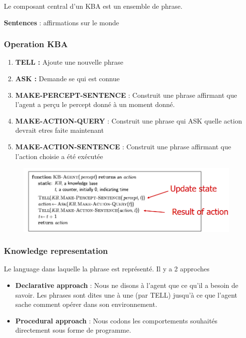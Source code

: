 \documentclass[12pt]{article}
\begin{document}
		
		Le composant central d'un KBA est un ensemble de phrase.
		
		\textbf{Sentences} : affirmations sur le monde
			
			
		\subsubsection{Operation KBA}
			\begin{enumerate}
				\item \textbf{TELL :} Ajoute une nouvelle phrase
				\item \textbf{ASK :} Demande se qui est connue
				\item \textbf{MAKE-PERCEPT-SENTENCE} : Construit une phrase affirmant que l'agent a perçu le percept donné à un moment donné.
				\item \textbf{MAKE-ACTION-QUERY} : Construit une phrase qui ASK quelle action devrait etres faite maintenant
				\item \textbf{MAKE-ACTION-SENTENCE} : Construit une phrase affirmant que l'action choisie a été exécutée
			\end{enumerate}
			
			\begin{figure}[htp]
				\centering
				\includegraphics[width=\textwidth]{img/KBA1.png}
			\end{figure}
			
		\subsubsection{Knowledge representation}
			Le language dans laquelle la phrase est représenté. Il y a 2 approches
			\begin{itemize}
				\item \textbf{Declarative approach} : Nous ne disons à l'agent que ce qu'il a besoin de savoir. Les phrases sont dites une à une (par TELL) jusqu'à ce que l'agent sache comment opérer dans son environnement.
				\item \textbf{Procedural approach} : Nous codons les comportements souhaités directement sous forme de programme.
			\end{itemize}
			
\end{document}
